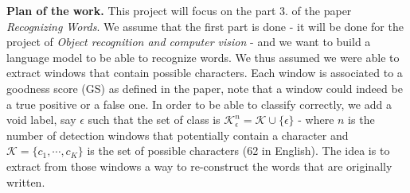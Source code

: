 \documentclass[10pt]{article}
\begin{document}
\textbf{Plan of the work. } This project will focus on the part 3. of the paper \emph{Recognizing Words}. We assume that the first part is done - it will be done for the project of \emph{Object recognition and computer vision} - and we want to build a language model to be able to recognize words. We thus assumed we were able to extract windows that contain possible characters. Each window is associated to a goodness score (GS) as defined in the paper, note that a window could indeed be a true positive or a false one. In order to be able to classify correctly, we add a void label, say $\epsilon$ such that the set of class is $\mathcal{K}_\epsilon^n = \mathcal{K} \cup \{ \epsilon \}$ - where $n$ is the number of detection windows that potentially contain a character and $\mathcal{K} = \{c_1,\cdots, c_K\}$ is the set of possible characters (62 in English). The idea is to extract from those windows a way to re-construct the words that are originally written. 
\end{document}

